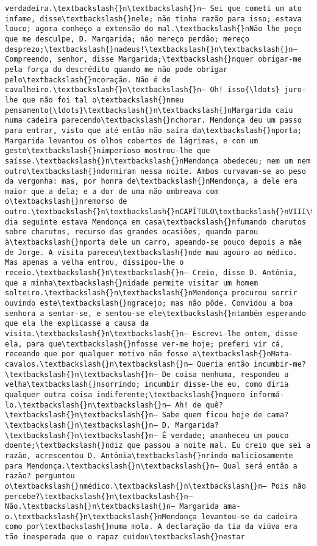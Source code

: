 \begin{Verbatim}[commandchars=\\\{\}]
verdadeira.\textbackslash{}n\textbackslash{}n— Sei que cometi um ato infame, disse\textbackslash{}nele; não tinha razão para isso; estava louco; agora conheço a extensão do mal.\textbackslash{}nNão lhe peço que me desculpe, D. Margarida; não mereço perdão; mereço desprezo;\textbackslash{}nadeus!\textbackslash{}n\textbackslash{}n— Compreendo, senhor, disse Margarida;\textbackslash{}nquer obrigar-me pela força do descrédito quando me não pode obrigar pelo\textbackslash{}ncoração. Não é de cavalheiro.\textbackslash{}n\textbackslash{}n— Oh! isso{\ldots} juro-lhe que não foi tal o\textbackslash{}nmeu pensamento{\ldots}\textbackslash{}n\textbackslash{}nMargarida caiu numa cadeira parecendo\textbackslash{}nchorar. Mendonça deu um passo para entrar, visto que até então não saíra da\textbackslash{}nporta; Margarida levantou os olhos cobertos de lágrimas, e com um gesto\textbackslash{}nimperioso mostrou-lhe que saísse.\textbackslash{}n\textbackslash{}nMendonça obedeceu; nem um nem outro\textbackslash{}ndormiram nessa noite. Ambos curvavam-se ao peso da vergonha: mas, por honra de\textbackslash{}nMendonça, a dele era maior que a dela; e a dor de uma não ombreava com o\textbackslash{}nremorso de outro.\textbackslash{}n\textbackslash{}nCAPÍTULO\textbackslash{}nVIII\textbackslash{}n\textbackslash{}nNo dia seguinte estava Mendonça em casa\textbackslash{}nfumando charutos sobre charutos, recurso das grandes ocasiões, quando parou à\textbackslash{}nporta dele um carro, apeando-se pouco depois a mãe de Jorge. A visita pareceu\textbackslash{}nde mau agouro ao médico. Mas apenas a velha entrou, dissipou-lhe o receio.\textbackslash{}n\textbackslash{}n— Creio, disse D. Antônia, que a minha\textbackslash{}nidade permite visitar um homem solteiro.\textbackslash{}n\textbackslash{}nMendonça procurou sorrir ouvindo este\textbackslash{}ngracejo; mas não pôde. Convidou a boa senhora a sentar-se, e sentou-se ele\textbackslash{}ntambém esperando que ela lhe explicasse a causa da visita.\textbackslash{}n\textbackslash{}n— Escrevi-lhe ontem, disse ela, para que\textbackslash{}nfosse ver-me hoje; preferi vir cá, receando que por qualquer motivo não fosse a\textbackslash{}nMata-cavalos.\textbackslash{}n\textbackslash{}n— Queria então incumbir-me?\textbackslash{}n\textbackslash{}n— De coisa nenhuma, respondeu a velha\textbackslash{}nsorrindo; incumbir disse-lhe eu, como diria qualquer outra coisa indiferente;\textbackslash{}nquero informá-lo.\textbackslash{}n\textbackslash{}n— Ah! de quê?\textbackslash{}n\textbackslash{}n— Sabe quem ficou hoje de cama?\textbackslash{}n\textbackslash{}n— D. Margarida?\textbackslash{}n\textbackslash{}n— É verdade; amanheceu um pouco doente;\textbackslash{}ndiz que passou a noite mal. Eu creio que sei a razão, acrescentou D. Antônia\textbackslash{}nrindo maliciosamente para Mendonça.\textbackslash{}n\textbackslash{}n— Qual será então a razão? perguntou o\textbackslash{}nmédico.\textbackslash{}n\textbackslash{}n— Pois não percebe?\textbackslash{}n\textbackslash{}n— Não.\textbackslash{}n\textbackslash{}n— Margarida ama-o.\textbackslash{}n\textbackslash{}nMendonça levantou-se da cadeira como por\textbackslash{}numa mola. A declaração da tia da viúva era tão inesperada que o rapaz cuidou\textbackslash{}nestar 
\end{Verbatim}
